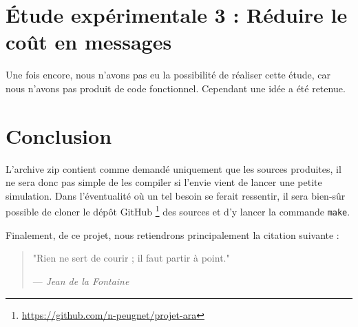 \documentclass[french]{article}
\begin{document}
\section{Étude expérimentale 3 : Réduire le coût en messages}

Une fois encore, nous n'avons pas eu la possibilité de réaliser cette étude, car nous n'avons pas produit de code fonctionnel.
Cependant une idée a été retenue.

\section*{Conclusion}

L'archive zip contient comme demandé uniquement que les sources produites, il ne sera donc pas simple de les compiler si l'envie vient de lancer une petite simulation.
Dans l'éventualité où un tel besoin se ferait ressentir, il sera bien-sûr possible de cloner le dépôt GitHub
\footnote{\url{https://github.com/n-peugnet/projet-ara}}
des sources et d'y lancer la commande \lstinline{make}.

Finalement, de ce projet, nous retiendrons principalement la citation suivante :

\begin{quotation}
	"Rien ne sert de courir ; il faut partir à point."

	--- \emph{Jean de la Fontaine}
\end{quotation}
\end{document}
